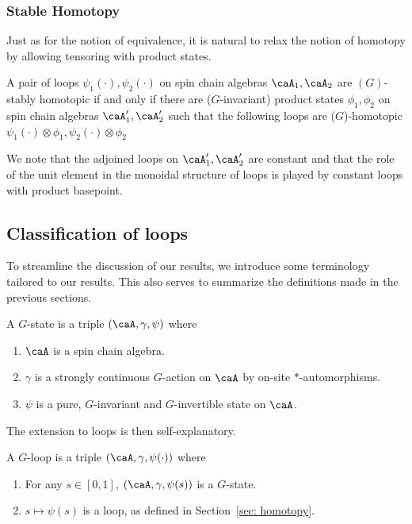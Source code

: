 \subsubsection{Stable Homotopy} \label{sec: stable homotopy}

Just as for the notion of equivalence, it is natural to relax the notion of homotopy by allowing tensoring with product states. 

\begin{definition}\label{def: stable homotopy}
	A pair of loops $\psi_1(\cdot),\psi_2(\cdot)$ on spin chain algebras $\caA_1,\caA_2$ are $(G)$-stably homotopic if and only if there are  ($G$-invariant) product states $\phi_1,\phi_2$ on spin chain algebras $\caA'_1,\caA'_2$ such that the following loops are ($G$)-homotopic 
	$\psi_1(\cdot)\otimes \phi_1, \psi_2(\cdot)\otimes \phi_2$
\end{definition} 

We note that the adjoined loops on $\caA'_1,\caA'_2$ are constant and that the role of the unit element in the monoidal structure of loops is played  by constant loops with product basepoint.







\subsection{Classification of loops}\label{sec: classification of loops}

To streamline the discussion of our results, we introduce some terminology tailored to our results.   This also serves to summarize the definitions made in the previous sections. 
\begin{definition}[$G$-state]
	A $G$-state is a triple $(\caA,\gamma,\psi)$ where
	\begin{enumerate}
		\item $\caA$ is a spin chain algebra.
		\item $\gamma$ is a strongly continuous $G$-action on $\caA$ by on-site $*$-automorphisms. 
		\item $\psi$ is a pure, $G$-invariant and $G$-invertible state on $\caA$. 
	\end{enumerate}
\end{definition}
The extension to loops is then self-explanatory. 
\begin{definition}[$G$-loop]\label{def: G-loop}
	A $G$-loop is a triple $(\caA,\gamma,\psi(\cdot))$ where
	\begin{enumerate}
		\item For any $s\in [0,1]$, $(\caA,\gamma,\psi(s))$ is a $G$-state. 
		\item $s\mapsto \psi(s)$ is a loop, as defined in Section~\ref{sec: homotopy}.  
	\end{enumerate}
\end{definition}


